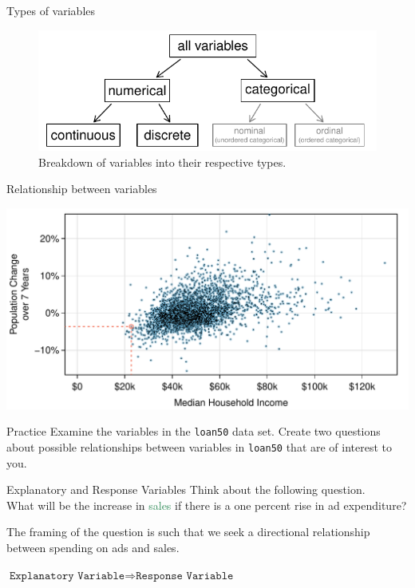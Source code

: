 \documentclass[notes,11pt, aspectratio=169]{beamer}
\begin{document}
\begin{frame}{Types of variables}
\begin{figure}[h]
  \centering
  \includegraphics[scale=0.57]{graphs/variables.pdf}
  \caption{Breakdown of variables into their respective types.}
  \label{variables}
\end{figure}

\end{frame}


\begin{frame}{Relationship between variables}
\begin{center}
\includegraphics[scale=0.8]{graphs/pop_change_v_med_income.pdf}
\end{center}
\end{frame}

\begin{frame}{Practice}
Examine the variables in the \texttt{loan50} data set. Create two questions about possible relationships between variables in \texttt{loan50} that are of interest to you.
\end{frame}

\begin{frame}{Explanatory and Response Variables}
Think about the following question. \\

What will be the increase in \textcolor{seagreen}{sales} if there is a one percent rise in \textcolor{tangerine}{ad expenditure}? \\

\pause

The framing of the question is such that we seek a directional relationship between spending on ads and sales. 

\vspace{5mm}

\begin{center}

\colorbox{textboxgreen}{
$\texttt{Explanatory Variable} \Rightarrow \texttt{Response Variable}$
}

\end{center}
\end{frame}
\end{document}
